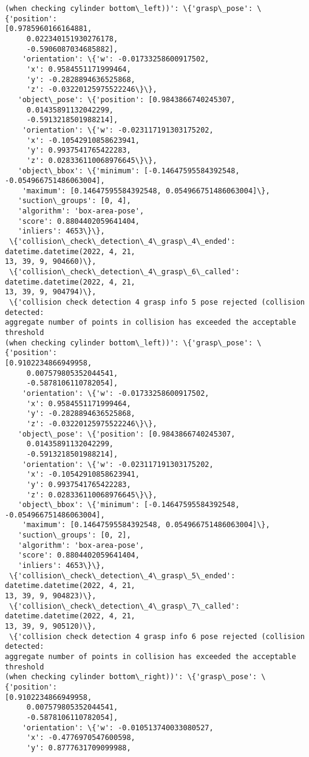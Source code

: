 \documentclass[11pt]{article}
\begin{document}
\begin{tcolorbox}[breakable, size=fbox, boxrule=.5pt, pad at break*=1mm, opacityfill=0]
\begin{Verbatim}[commandchars=\\\{\}]
(when checking cylinder bottom\_left))': \{'grasp\_pose': \{'position':
[0.9785960166164881,
     0.022340151930276178,
     -0.5906087034685882],
    'orientation': \{'w': -0.01733258600917502,
     'x': 0.9584551171999464,
     'y': -0.2828894636525868,
     'z': -0.03220125975522246\}\},
   'object\_pose': \{'position': [0.9843866740245307,
     0.01435891132042299,
     -0.5913218501988214],
    'orientation': \{'w': -0.023117191303175202,
     'x': -0.10542910858623941,
     'y': 0.9937541765422283,
     'z': 0.028336110068976645\}\},
   'object\_bbox': \{'minimum': [-0.14647595584392548, -0.054966751486063004],
    'maximum': [0.14647595584392548, 0.054966751486063004]\},
   'suction\_groups': [0, 4],
   'algorithm': 'box-area-pose',
   'score': 0.8804402059641404,
   'inliers': 4653\}\},
 \{'collision\_check\_detection\_4\_grasp\_4\_ended': datetime.datetime(2022, 4, 21,
13, 39, 9, 904660)\},
 \{'collision\_check\_detection\_4\_grasp\_6\_called': datetime.datetime(2022, 4, 21,
13, 39, 9, 904794)\},
 \{'collision check detection 4 grasp info 5 pose rejected (collision detected:
aggregate number of points in collision has exceeded the acceptable threshold
(when checking cylinder bottom\_left))': \{'grasp\_pose': \{'position':
[0.9102234866949958,
     0.007579805352044541,
     -0.5878106110782054],
    'orientation': \{'w': -0.01733258600917502,
     'x': 0.9584551171999464,
     'y': -0.2828894636525868,
     'z': -0.03220125975522246\}\},
   'object\_pose': \{'position': [0.9843866740245307,
     0.01435891132042299,
     -0.5913218501988214],
    'orientation': \{'w': -0.023117191303175202,
     'x': -0.10542910858623941,
     'y': 0.9937541765422283,
     'z': 0.028336110068976645\}\},
   'object\_bbox': \{'minimum': [-0.14647595584392548, -0.054966751486063004],
    'maximum': [0.14647595584392548, 0.054966751486063004]\},
   'suction\_groups': [0, 2],
   'algorithm': 'box-area-pose',
   'score': 0.8804402059641404,
   'inliers': 4653\}\},
 \{'collision\_check\_detection\_4\_grasp\_5\_ended': datetime.datetime(2022, 4, 21,
13, 39, 9, 904823)\},
 \{'collision\_check\_detection\_4\_grasp\_7\_called': datetime.datetime(2022, 4, 21,
13, 39, 9, 905120)\},
 \{'collision check detection 4 grasp info 6 pose rejected (collision detected:
aggregate number of points in collision has exceeded the acceptable threshold
(when checking cylinder bottom\_right))': \{'grasp\_pose': \{'position':
[0.9102234866949958,
     0.007579805352044541,
     -0.5878106110782054],
    'orientation': \{'w': -0.010513740033080527,
     'x': -0.4776970547600598,
     'y': 0.8777631709099988,

\end{Verbatim}
\end{tcolorbox}
\end{document}
